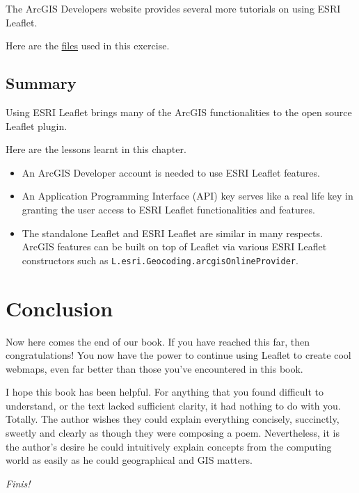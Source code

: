 \documentclass[
]{book}
\begin{document}
The ArcGIS Developers website provides several more tutorials on using ESRI Leaflet.

Here are the \href{https://github.com/sammigachuhi/my-leaflet-project/tree/main/my-leaflet-code/chapter-14-ESRI_Leaflet}{files} used in this exercise.

\hypertarget{summary-12}{%
\section{Summary}\label{summary-12}}

Using ESRI Leaflet brings many of the ArcGIS functionalities to the open source Leaflet plugin.

Here are the lessons learnt in this chapter.

\begin{itemize}
\item
  An ArcGIS Developer account is needed to use ESRI Leaflet features.
\item
  An Application Programming Interface (API) key serves like a real life key in granting the user access to ESRI Leaflet functionalities and features.
\item
  The standalone Leaflet and ESRI Leaflet are similar in many respects. ArcGIS features can be built on top of Leaflet via various ESRI Leaflet constructors such as \texttt{L.esri.Geocoding.arcgisOnlineProvider}.
\end{itemize}

\hypertarget{conclusion}{%
\chapter{Conclusion}\label{conclusion}}

Now here comes the end of our book. If you have reached this far, then congratulations! You now have the power to continue using Leaflet to create cool webmaps, even far better than those you've encountered in this book.

I hope this book has been helpful. For anything that you found difficult to understand, or the text lacked sufficient clarity, it had nothing to do with you. Totally. The author wishes they could explain everything concisely, succinctly, sweetly and clearly as though they were composing a poem. Nevertheless, it is the author's desire he could intuitively explain concepts from the computing world as easily as he could geographical and GIS matters.

\emph{Finis!}

  
\end{document}
